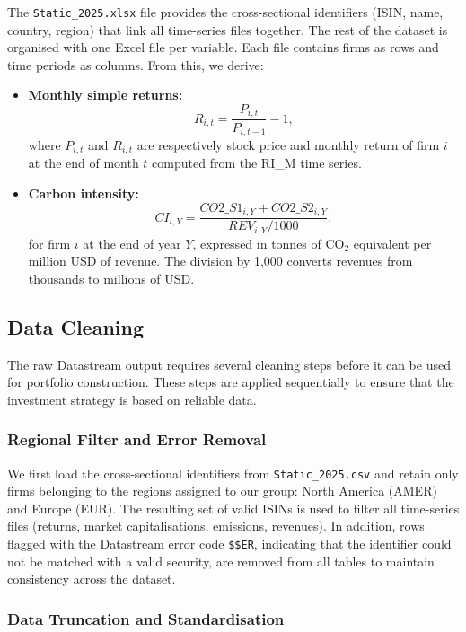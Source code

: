 \documentclass[11pt,a4paper]{article}
\begin{document}
The \texttt{Static\_2025.xlsx} file provides the cross-sectional identifiers (ISIN, name, country, region) that link all time-series files together. The rest of the dataset is organised with one Excel file per variable. Each file contains firms as rows and time periods as columns. From this, we derive:

\begin{itemize}[leftmargin=*]
    \item \textbf{Monthly simple returns:}
    \[
    R_{i,t} = \frac{P_{i,t}}{P_{i,t-1}} - 1,
    \]
    where \(P_{i,t}\) and \(R_{i,t}\) are respectively stock price and monthly return of firm \(i\) at the end of month \(t\) computed from the RI\_M time series. 

    \item \textbf{Carbon intensity:}
    \[
    CI_{i,Y} = \frac{CO2\_S1_{i,Y} + CO2\_S2_{i,Y}}{REV_{i,Y}/1000},
    \]
    for firm \(i\) at the end of year \(Y\), expressed in tonnes of CO\(_2\) equivalent per million USD of revenue. The division by 1,000 converts revenues from thousands to millions of USD.
\end{itemize}

\subsection{Data Cleaning}

The raw Datastream output requires several cleaning steps before it can be used for portfolio construction. These steps are applied sequentially to ensure that the investment strategy is based on reliable data.

\subsubsection{Regional Filter and Error Removal}

We first load the cross-sectional identifiers from \texttt{Static\_2025.csv} and retain only firms belonging to the regions assigned to our group: North America (AMER) and Europe (EUR). The resulting set of valid ISINs is used to filter all time-series files (returns, market capitalisations, emissions, revenues). In addition, rows flagged with the Datastream error code \texttt{\$\$ER}, indicating that the identifier could not be matched with a valid security, are removed from all tables to maintain consistency across the dataset.

\subsubsection{Data Truncation  and Standardisation}
\end{document}
